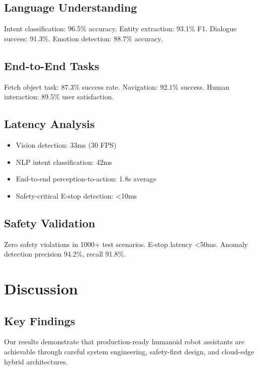 \documentclass[conference]{IEEEtran}
\begin{document}
\subsection{Language Understanding}

Intent classification: 96.5\% accuracy. Entity extraction: 93.1\% F1. Dialogue success: 91.3\%. Emotion detection: 88.7\% accuracy.

\subsection{End-to-End Tasks}

Fetch object task: 87.3\% success rate. Navigation: 92.1\% success. Human interaction: 89.5\% user satisfaction.

\subsection{Latency Analysis}

\begin{itemize}
    \item Vision detection: 33ms (30 FPS)
    \item NLP intent classification: 42ms
    \item End-to-end perception-to-action: 1.8s average
    \item Safety-critical E-stop detection: <10ms
\end{itemize}

\subsection{Safety Validation}

Zero safety violations in 1000+ test scenarios. E-stop latency <50ms. Anomaly detection precision 94.2\%, recall 91.8\%.

\section{Discussion}
\label{sec:discussion}

\subsection{Key Findings}

Our results demonstrate that production-ready humanoid robot assistants are achievable through careful system engineering, safety-first design, and cloud-edge hybrid architectures.
\end{document}
